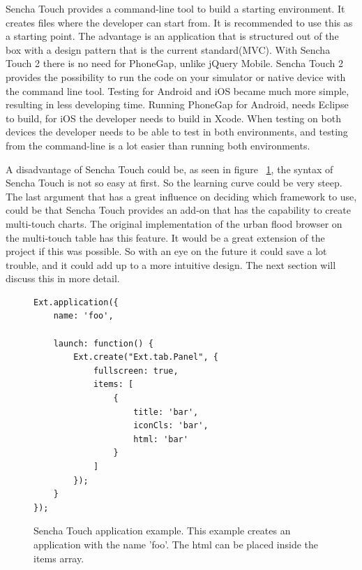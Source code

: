 \begin{description}
Sencha Touch provides a command-line tool to build a starting environment. It creates files where the developer can start from. It is recommended to use this as a starting point. The advantage is an application that is structured out of the box with a design pattern that is the current standard(MVC). With Sencha Touch 2 there is no need for PhoneGap, unlike jQuery Mobile. Sencha Touch 2 provides the possibility to run the code on your simulator or native device with the command line tool. Testing for Android and iOS became much more simple, resulting in less developing time. Running PhoneGap for Android, needs Eclipse\cite{eclipse} to build, for iOS the developer needs to build in Xcode\cite{xcode}. When testing on both devices the developer needs to be able to test in both environments, and testing from the command-line is a lot easier than running both environments. 

A disadvantage of Sencha Touch could be, as seen in figure ~\ref{fig:sencha}, the syntax of Sencha Touch is not so easy at first. So the learning curve could be very steep.
The last argument that has a great influence on deciding which framework to use, could be that Sencha Touch provides an add-on that has the capability to create multi-touch charts. The original implementation of the urban flood browser on the multi-touch table has this feature. It would be a great extension of the project if this was possible. So with an eye on the future it could save a lot trouble, and it could add up to a more intuitive design. The next section will discuss this in more detail.

\begin{figure}[H]
\begin{lstlisting}
Ext.application({
    name: 'foo',

    launch: function() {
        Ext.create("Ext.tab.Panel", {
            fullscreen: true,
            items: [
                {
                    title: 'bar',
                    iconCls: 'bar',
                    html: 'bar'
                }
            ]
        });
    }
});
\end{lstlisting}
\caption{Sencha Touch application example. This example creates an application with the name 'foo'.  The html can be placed inside the items array. }
\label{fig:sencha}
\end{figure}
\end{description}

